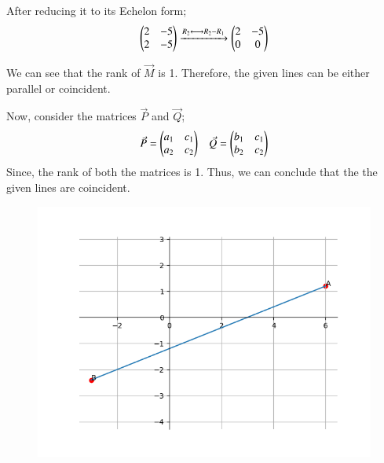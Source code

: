 \documentclass[journal]{IEEEtran}
\begin{document}
After reducing it to its Echelon form;
\begin{align}
\begin{pmatrix}2 & -5 \\ 2 & -5\end{pmatrix}\xrightarrow{R_2\longleftrightarrow R_2-R_1}\begin{pmatrix}2 & -5 \\ 0 & 0\end{pmatrix}
\end{align}

We can see that the rank of $\Vec{M}$ is 1. Therefore, the given lines can be either parallel or coincident.

Now, consider the matrices $\Vec{P}$ and $\Vec{Q}$;
\begin{align}
\Vec{P}=\begin{pmatrix}a_1 & c_1 \\ a_2 & c_2\end{pmatrix} && \Vec{Q}=\begin{pmatrix}b_1 & c_1 \\ b_2 & c_2\end{pmatrix}
\end{align}
Since, the rank of both the matrices is 1. Thus, we can conclude that the the given lines are coincident.

\begin{figure}[H]
\centering
\includegraphics[width=0.8\columnwidth]{figs/img.png}
\caption*{}
\end{figure}
\end{document}
